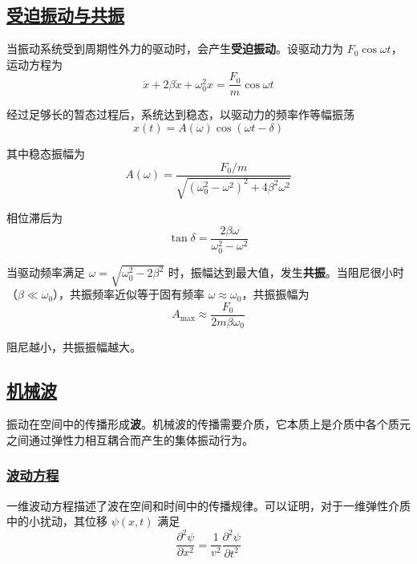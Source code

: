 \subsection{\protect\hyperlink{:}{受迫振动与共振}}

当振动系统受到周期性外力的驱动时，会产生\textbf{受迫振动}。设驱动力为 $F_0\cos\omega t$，运动方程为
\begin{equation}
    \ddot{x} + 2\beta\dot{x} + \omega_0^2 x = \frac{F_0}{m}\cos\omega t
\end{equation}

经过足够长的暂态过程后，系统达到稳态，以驱动力的频率作等幅振荡
\begin{equation}
    x(t) = A(\omega)\cos(\omega t - \delta)
\end{equation}

其中稳态振幅为
\begin{equation}
    A(\omega) = \frac{F_0/m}{\sqrt{(\omega_0^2 - \omega^2)^2 + 4\beta^2\omega^2}}
\end{equation}

相位滞后为
\begin{equation}
    \tan\delta = \frac{2\beta\omega}{\omega_0^2 - \omega^2}
\end{equation}

当驱动频率满足 $\omega = \sqrt{\omega_0^2 - 2\beta^2}$ 时，振幅达到最大值，发生\textbf{共振}。当阻尼很小时（$\beta \ll \omega_0$），共振频率近似等于固有频率 $\omega \approx \omega_0$，共振振幅为
\begin{equation}
    A_{\max} \approx \frac{F_0}{2m\beta\omega_0}
\end{equation}

阻尼越小，共振振幅越大。

\subsection{\protect\hyperlink{:}{机械波}}

振动在空间中的传播形成\textbf{波}。机械波的传播需要介质，它本质上是介质中各个质元之间通过弹性力相互耦合而产生的集体振动行为。

\subsubsection{\protect\hyperlink{:}{波动方程}}

一维波动方程描述了波在空间和时间中的传播规律。可以证明，对于一维弹性介质中的小扰动，其位移 $\psi(x,t)$ 满足
\begin{equation}
    \frac{\partial^2 \psi}{\partial x^2} = \frac{1}{v^2}\frac{\partial^2 \psi}{\partial t^2}
\end{equation}

